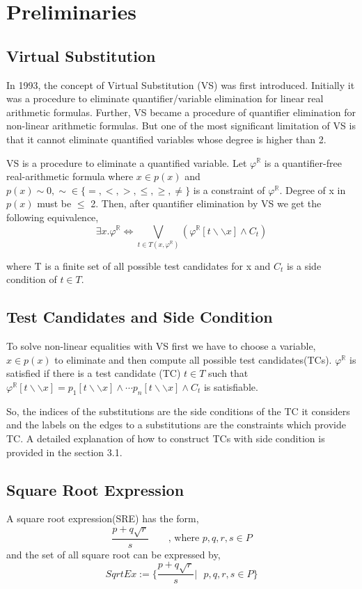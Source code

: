 \section{Preliminaries}
\label{sec:preliminaries}
\subsection{Virtual Substitution}
In 1993, the concept of Virtual Substitution (VS) was first introduced. Initially it was a procedure to eliminate quantifier/variable elimination for linear real arithmetic formulas. Further, VS became a procedure of quantifier elimination for non-linear arithmetic formulas. But one of the most significant limitation of VS is that it cannot eliminate quantified variables whose degree is higher than 2.

VS is a procedure to eliminate a quantified variable. Let $\varphi^\mathbb{R}$ is a quantifier-free real-arithmetic formula where $x\in p(x)$ and $p(x) \sim 0, \sim \in \{=,<,>,\leq,\geq,\neq\}$ is a constraint of   $\varphi^\mathbb{R}$. Degree of x in $p(x)$ must be $\leq$ 2. Then, after quantifier elimination by VS we get the following equivalence,
$$ \exists x. \varphi^\mathbb{R} \Longleftrightarrow \bigvee\limits_{t\in T(x,\varphi^\mathbb{R})}  (\varphi^\mathbb{R} [t\backslash\backslash x] \wedge C_t)$$

where T is a finite set of all possible test candidates for x and $C_t$ is a side condition of $t \in T$.
\subsection{Test Candidates and Side Condition}
To solve non-linear equalities with VS first we have to choose a variable, $x\in p(x)$ to eliminate and then compute all possible test candidates(TCs). $\varphi^\mathbb{R}$ is satisfied if there is a test candidate (TC) $t\in T$ such that $\varphi^\mathbb{R} [t\backslash\backslash x] = p_1[t\backslash\backslash x] \wedge \cdots p_n[t\backslash\backslash x] \wedge C_t$ is satisfiable.

So, the indices of the substitutions are the side conditions of the TC it considers and the labels on the edges to a substitutions are the constraints which provide TC. A detailed explanation of how to construct TCs with side condition is provided in the section 3.1.
\subsection{Square Root Expression}
A square root expression(SRE) has the form,
$$\frac{p+q\sqrt{r}}{s}\qquad  \text{, where } p,q,r,s \in P $$
and the set of all square root can be expressed by,
$$SqrtEx := \{\frac{p+q\sqrt{r}}{s} \lvert  \text{ } p,q,r,s \in P\}$$

